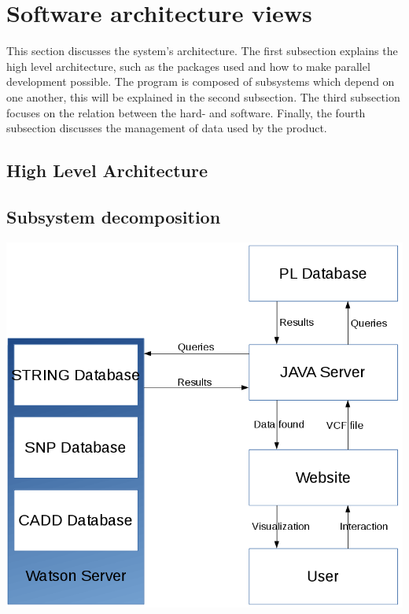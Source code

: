 \section{Software architecture views}
	This section discusses the system's architecture. The first subsection explains the high level architecture, such as the packages used and how to make parallel development possible. The program is composed of subsystems which depend on one another, this will be explained in the second subsection. The third subsection focuses on the relation between the hard- and software. Finally, the fourth subsection discusses the management of data used by the product.
	\subsection{High Level Architecture}
	\subsection{Subsystem decomposition}
		\includegraphics[scale=0.5]{schema1-improved.png}

